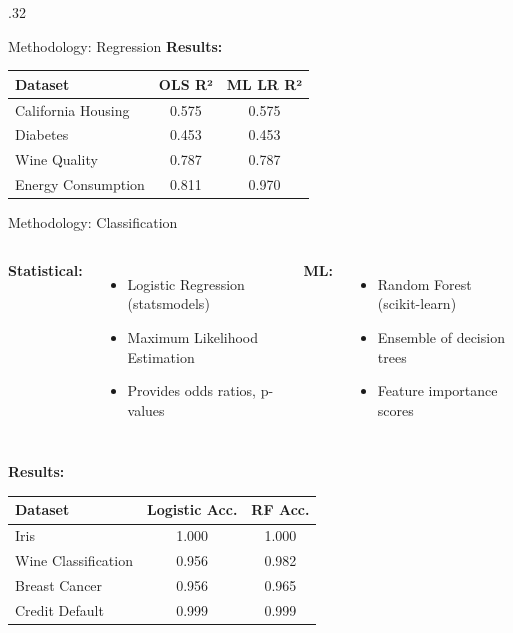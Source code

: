 \documentclass[final]{beamer}
\begin{document}
\begin{frame}[t]
\begin{columns}[t]
\begin{column}{.32\linewidth}
\begin{block}{Methodology: Regression}
\vspace{0.3cm}
\textbf{Results:}
\begin{center}
\small
\begin{tabular}{lcc}
\toprule
\textbf{Dataset} & \textbf{OLS R²} & \textbf{ML LR R²} \\
\midrule
California Housing & 0.575 & 0.575 \\
Diabetes & 0.453 & 0.453 \\
Wine Quality & 0.787 & 0.787 \\
Energy Consumption & 0.811 & \textcolor{mlcolor}{0.970} \\
\bottomrule
\end{tabular}
\end{center}
\end{block}

\begin{block}{Methodology: Classification}
\begin{columns}[t]
\textcolor{statcolor}{\textbf{Statistical:}}
\begin{itemize}
    \item Logistic Regression (statsmodels)
    \item Maximum Likelihood Estimation
    \item Provides odds ratios, p-values
\end{itemize}

\textcolor{mlcolor}{\textbf{ML:}}
\begin{itemize}
    \item Random Forest (scikit-learn)
    \item Ensemble of decision trees
    \item Feature importance scores
\end{itemize}
\end{columns}

\vspace{0.3cm}
\textbf{Results:}
\begin{center}
\small
\begin{tabular}{lcc}
\toprule
\textbf{Dataset} & \textbf{Logistic Acc.} & \textbf{RF Acc.} \\
\midrule
Iris & \textcolor{accentcolor}{1.000} & \textcolor{accentcolor}{1.000} \\
Wine Classification & 0.956 & \textcolor{mlcolor}{0.982} \\
Breast Cancer & 0.956 & \textcolor{mlcolor}{0.965} \\
Credit Default & \textcolor{accentcolor}{0.999} & \textcolor{accentcolor}{0.999} \\
\bottomrule
\end{tabular}
\end{center}
\end{block}


\end{column}
\end{columns}
\end{frame}
\end{document}
